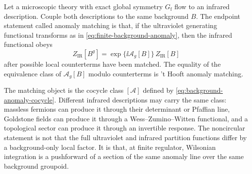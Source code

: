 \begin{remark}
\label{rem:anomaly-matching-background-cocycle-class}
Let a microscopic theory with exact global symmetry \(G_{\mathrm f}\) flow to
an infrared description.  Couple both descriptions to the same background
\(B\).  The endpoint statement called anomaly matching is that, if the
ultraviolet generating functional transforms as in
\eqref{eq:finite-background-anomaly}, then the infrared functional obeys
\[
  Z_{\mathrm{IR}}[B^g]
  =
  \exp\{\ii\mathcal A_g[B]\}\,Z_{\mathrm{IR}}[B]
\]
after possible local counterterms have been matched.  The equality of the
equivalence class of \(\mathcal A_g[B]\) modulo counterterms is 't Hooft
anomaly matching.

The matching object is the cocycle class
\([\mathcal A]\) defined by \eqref{eq:background-anomaly-cocycle}.  Different
infrared descriptions may carry the same class: massless fermions can produce
it through their determinant or Pfaffian line, Goldstone fields can produce it
through a Wess--Zumino--Witten functional, and a topological sector can produce
it through an invertible response.  The noncircular statement is not that the
full ultraviolet and infrared partition functions differ by a background-only
local factor.  It is that, at finite regulator, Wilsonian integration is a
pushforward of a section of the same anomaly line over the same background
groupoid.


\end{remark}

